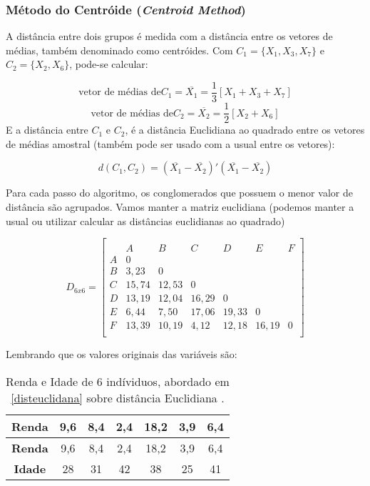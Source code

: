 \documentclass[
  openany]{book}
\begin{document}
\hypertarget{muxe9todo-do-centruxf3ide-centroid-method}{%
\subsubsection{\texorpdfstring{Método do Centróide (\emph{Centroid Method})}{Método do Centróide (Centroid Method)}}\label{muxe9todo-do-centruxf3ide-centroid-method}}

A distância entre dois grupos é medida com a distância entre os vetores de médias, também denominado como centróides. Com \(C_1=\{X_1,X_3,X_7\}\) e \(C_2=\{X_2,X_6\}\), pode-se calcular:

\[\mbox{vetor de médias de} C_1=\overline{X_1}=\frac{1}{3}[X_1+X_3+X_7] \]
\[\mbox{vetor de médias de} C_2=\overline{X_2}=\frac{1}{2}[X_2+X_6]\]
E a distância entre \(C_1\) e \(C_2\), é a distância Euclidiana ao quadrado entre os vetores de médias amostral (também pode ser usado com a usual entre os vetores):

\begin{equation}
d(C_1,C_2)= (\overline{X_1}-\overline{X_2})'(\overline{X_1}-\overline{X_2})
 \label{eq:distcentroide}
\end{equation}

Para cada passo do algoritmo, os conglomerados que possuem o menor valor de distância são agrupados. Vamos manter a matriz euclidiana (podemos manter a usual ou utilizar calcular as distâncias euclidianas ao quadrado)

\[D_{6x6}=\begin{bmatrix}\\
 &A&B&C&D&E&F \\
 A&0&&&&&\\
 B&3,23&0&&&&\\
 C & 15,74& 12,53&0&&&\\
 D& 13,19& 12,04& 16,29&0&&\\
 E& 6,44& 7,50& 17,06& 19,33&0&\\
 F& 13,39& 10,19& 4,12& 12,18& 16,19&0 \\
\end{bmatrix}\]

Lembrando que os valores originais das variáveis são:

\begin{longtable}[]{@{}ccccccc@{}}
\caption{\label{tab:dadosrenda} Renda e Idade de 6 indíviduos, abordado em \ref{disteuclidana} sobre distância Euclidiana \citep{mingoti2007analise}.}\tabularnewline
\toprule
\textbf{Renda} & 9,6 & 8,4 & 2,4 & 18,2 & 3,9 & 6,4\tabularnewline
\midrule
\endfirsthead
\toprule
\textbf{Renda} & 9,6 & 8,4 & 2,4 & 18,2 & 3,9 & 6,4\tabularnewline
\midrule
\endhead
\textbf{Idade} & 28 & 31 & 42 & 38 & 25 & 41\tabularnewline
\bottomrule
\end{longtable}
\end{document}
